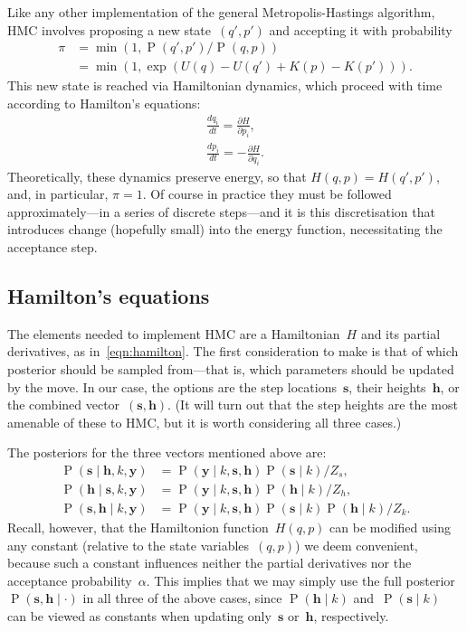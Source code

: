 \documentclass[11pt,a4paper]{article}
\newcommand\ub[1]{\symbf{#1}}                    %
\DeclareMathOperator\Pb{P}                       %
\theoremstyle{definition}
\begin{document}
Like any other implementation of the general Metropolis-Hastings algorithm, HMC
involves proposing a new state~$(q',p')$ and accepting it with probability
\begin{align*}
  \pi &= \min(1, \Pb(q',p')/\Pb(q,p)) \\
    &= \min(1, \exp(U(q)-U(q')+K(p)-K(p'))).
\end{align*}
This new state is reached via Hamiltonian dynamics, which proceed with time
according to Hamilton's equations:
\begin{equation}\label{eqn:hamilton}
\begin{gathered}
  \frac{dq_i}{dt} = \frac{\partial H}{\partial p_i}, \\
  \frac{dp_i}{dt} = -\frac{\partial H}{\partial q_i}.
\end{gathered}
\end{equation}
Theoretically, these dynamics preserve energy, so that $H(q,p) = H(q',p')$, and,
in particular, $\pi = 1$. Of course in practice they must be followed
approximately---in a series of discrete steps---and it is this discretisation
that introduces change (hopefully small) into the energy function, necessitating
the acceptance step.

\subsection{Hamilton's equations} %

The elements needed to implement HMC are a Hamiltonian~$H$ and its partial
derivatives, as in~\eqref{eqn:hamilton}. The first consideration to make is that
of which posterior should be sampled from---that is, which parameters should be
updated by the move. In our case, the options are the step locations~$\ub{s}$,
their heights~$\ub{h}$, or the combined vector~$(\ub{s},\ub{h})$. (It will turn
out that the step heights are the most amenable of these to HMC, but it is worth
considering all three cases.)

The posteriors for the three vectors mentioned above are:
\begin{align*}
  \Pb(\ub{s} \mid \ub{h},k,\ub{y}) &= \Pb(\ub{y} \mid k,\ub{s},\ub{h})
    \Pb(\ub{s} \mid k) / Z_s, \\
  \Pb(\ub{h} \mid \ub{s},k,\ub{y}) &= \Pb(\ub{y} \mid k,\ub{s},\ub{h})
    \Pb(\ub{h} \mid k) / Z_h, \\
  \Pb(\ub{s},\ub{h} \mid k,\ub{y}) &= \Pb(\ub{y} \mid k,\ub{s},\ub{h})
    \Pb(\ub{s} \mid k) \Pb(\ub{h} \mid k) / Z_k.
\end{align*}
Recall, however, that the Hamiltonion function~$H(q,p)$ can be modified using
any constant (relative to the state variables~$(q,p)$) we deem convenient,
because such a constant influences neither the partial derivatives nor the
acceptance probability~$\alpha$. This implies that we may simply use the full
posterior~$\Pb(\ub{s},\ub{h} \mid \cdot)$ in all three of the above cases, since
$\Pb(\ub{h} \mid k)$ and~$\Pb(\ub{s} \mid k)$ can be viewed as constants when
updating only~$\ub{s}$ or~$\ub{h}$, respectively.
\end{document}
